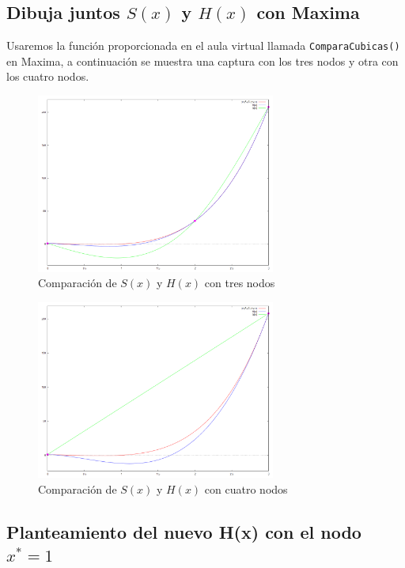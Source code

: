 \documentclass{article}
\begin{document}
\subsection{Dibuja juntos $S(x)$ y $H(x)$ con Maxima}

Usaremos la función proporcionada en el aula virtual llamada \verb|ComparaCubicas()| en Maxima, a continuación se muestra una captura con los tres nodos y otra con los cuatro nodos.

\begin{figure}[ht]
    \centering
    \includegraphics[width=0.7\textwidth]{src/comparacubicas.png}
    \caption{Comparación de $S(x)$ y $H(x)$ con tres nodos}
    \label{fig:tres_nodos}
\end{figure}

\newpage

\begin{figure}[hb]
    \centering
    \includegraphics[width=0.7\textwidth]{src/comparacubicas2.png}
    \caption{Comparación de $S(x)$ y $H(x)$ con cuatro nodos}
    \label{fig:cuatro_nodos}
\end{figure}

\newpage

\subsection{Planteamiento del nuevo H(x) con el nodo $x^*=1$}
\end{document}

